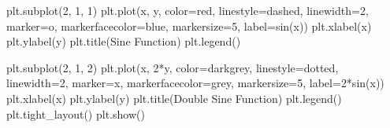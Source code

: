 \documentclass[
  letterpaper,
  DIV=11,
  numbers=noendperiod]{scrreprt}
\newenvironment{Shaded}{\begin{snugshade}}{\end{snugshade}}
\newcommand{\DecValTok}[1]{\textcolor[rgb]{0.68,0.00,0.00}{#1}}
\newcommand{\NormalTok}[1]{\textcolor[rgb]{0.00,0.23,0.31}{#1}}
\newcommand{\OperatorTok}[1]{\textcolor[rgb]{0.37,0.37,0.37}{#1}}
\newcommand{\StringTok}[1]{\textcolor[rgb]{0.13,0.47,0.30}{#1}}
\begin{document}
\begin{Shaded}
\begin{Highlighting}[]
\NormalTok{plt.subplot(}\DecValTok{2}\NormalTok{, }\DecValTok{1}\NormalTok{, }\DecValTok{1}\NormalTok{)}
\NormalTok{plt.plot(x, y, color}\OperatorTok{=}\StringTok{\textquotesingle{}red\textquotesingle{}}\NormalTok{, linestyle}\OperatorTok{=}\StringTok{\textquotesingle{}dashed\textquotesingle{}}\NormalTok{, linewidth}\OperatorTok{=}\DecValTok{2}\NormalTok{, marker}\OperatorTok{=}\StringTok{\textquotesingle{}o\textquotesingle{}}\NormalTok{, }
\NormalTok{            markerfacecolor}\OperatorTok{=}\StringTok{\textquotesingle{}blue\textquotesingle{}}\NormalTok{, markersize}\OperatorTok{=}\DecValTok{5}\NormalTok{,}
\NormalTok{            label}\OperatorTok{=}\StringTok{\textquotesingle{}sin(x)\textquotesingle{}}\NormalTok{)}
\NormalTok{plt.xlabel(}\StringTok{\textquotesingle{}x\textquotesingle{}}\NormalTok{)}
\NormalTok{plt.ylabel(}\StringTok{\textquotesingle{}y\textquotesingle{}}\NormalTok{)}
\NormalTok{plt.title(}\StringTok{\textquotesingle{}Sine Function\textquotesingle{}}\NormalTok{)}
\NormalTok{plt.legend()}

\NormalTok{plt.subplot(}\DecValTok{2}\NormalTok{, }\DecValTok{1}\NormalTok{, }\DecValTok{2}\NormalTok{)}
\NormalTok{plt.plot(x, }\DecValTok{2}\OperatorTok{*}\NormalTok{y, color}\OperatorTok{=}\StringTok{\textquotesingle{}darkgrey\textquotesingle{}}\NormalTok{, linestyle}\OperatorTok{=}\StringTok{\textquotesingle{}dotted\textquotesingle{}}\NormalTok{, linewidth}\OperatorTok{=}\DecValTok{2}\NormalTok{, marker}\OperatorTok{=}\StringTok{\textquotesingle{}x\textquotesingle{}}\NormalTok{,}
\NormalTok{            markerfacecolor}\OperatorTok{=}\StringTok{\textquotesingle{}grey\textquotesingle{}}\NormalTok{, markersize}\OperatorTok{=}\DecValTok{5}\NormalTok{,}
\NormalTok{            label}\OperatorTok{=}\StringTok{\textquotesingle{}2*sin(x)\textquotesingle{}}\NormalTok{)}
\NormalTok{plt.xlabel(}\StringTok{\textquotesingle{}x\textquotesingle{}}\NormalTok{)}
\NormalTok{plt.ylabel(}\StringTok{\textquotesingle{}y\textquotesingle{}}\NormalTok{)}
\NormalTok{plt.title(}\StringTok{\textquotesingle{}Double Sine Function\textquotesingle{}}\NormalTok{)}
\NormalTok{plt.legend()   }
\NormalTok{plt.tight\_layout()}
\NormalTok{plt.show()}
\end{Highlighting}
\end{Shaded}
\end{document}
